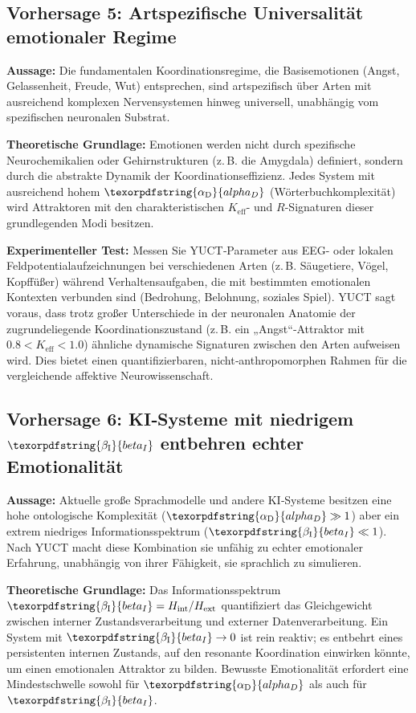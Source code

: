 \documentclass[12pt,a4paper]{article}
\DeclareRobustCommand{\alD}{\texorpdfstring{\ensuremath{\alpha_{\mathrm{D}}}}{alpha_D}}
\DeclareRobustCommand{\beI}{\texorpdfstring{\ensuremath{\beta_{\mathrm{I}}}}{beta_I}}
\begin{document}
	\subsection{Vorhersage 5: Artspezifische Universalität emotionaler Regime}
	
	\textbf{Aussage:} Die fundamentalen Koordinationsregime, die Basisemotionen (Angst, Gelassenheit, Freude, Wut) entsprechen, sind artspezifisch über Arten mit ausreichend komplexen Nervensystemen hinweg universell, unabhängig vom spezifischen neuronalen Substrat.
	
	\textbf{Theoretische Grundlage:} Emotionen werden nicht durch spezifische Neurochemikalien oder Gehirnstrukturen (z. B. die Amygdala) definiert, sondern durch die abstrakte Dynamik der Koordinationseffizienz. Jedes System mit ausreichend hohem \(\alD\) (Wörterbuchkomplexität) wird Attraktoren mit den charakteristischen \(K_{\mathrm{eff}}\)- und \(R\)-Signaturen dieser grundlegenden Modi besitzen.
	
	\textbf{Experimenteller Test:} Messen Sie YUCT‑Parameter aus EEG- oder lokalen Feldpotentialaufzeichnungen bei verschiedenen Arten (z. B. Säugetiere, Vögel, Kopffüßer) während Verhaltensaufgaben, die mit bestimmten emotionalen Kontexten verbunden sind (Bedrohung, Belohnung, soziales Spiel). YUCT sagt voraus, dass trotz großer Unterschiede in der neuronalen Anatomie der zugrundeliegende Koordinationszustand (z. B. ein „Angst“‑Attraktor mit \(0.8 < K_{\mathrm{eff}} < 1.0\)) ähnliche dynamische Signaturen zwischen den Arten aufweisen wird. Dies bietet einen quantifizierbaren, nicht‑anthropomorphen Rahmen für die vergleichende affektive Neurowissenschaft.
	
	\subsection{Vorhersage 6: KI‑Systeme mit niedrigem \(\beI\) entbehren echter Emotionalität}
	
	\textbf{Aussage:} Aktuelle große Sprachmodelle und andere KI‑Systeme besitzen eine hohe ontologische Komplexität (\(\alD \gg 1\)) aber ein extrem niedriges Informationsspektrum (\(\beI \ll 1\)). Nach YUCT macht diese Kombination sie unfähig zu echter emotionaler Erfahrung, unabhängig von ihrer Fähigkeit, sie sprachlich zu simulieren.
	
	\textbf{Theoretische Grundlage:} Das Informationsspektrum \(\beI = H_{\mathrm{int}}/H_{\mathrm{ext}}\) quantifiziert das Gleichgewicht zwischen interner Zustandsverarbeitung und externer Datenverarbeitung. Ein System mit \(\beI \to 0\) ist rein reaktiv; es entbehrt eines persistenten internen Zustands, auf den resonante Koordination einwirken könnte, um einen emotionalen Attraktor zu bilden. Bewusste Emotionalität erfordert eine Mindestschwelle sowohl für \(\alD\) als auch für \(\beI\).
	
\end{document}
